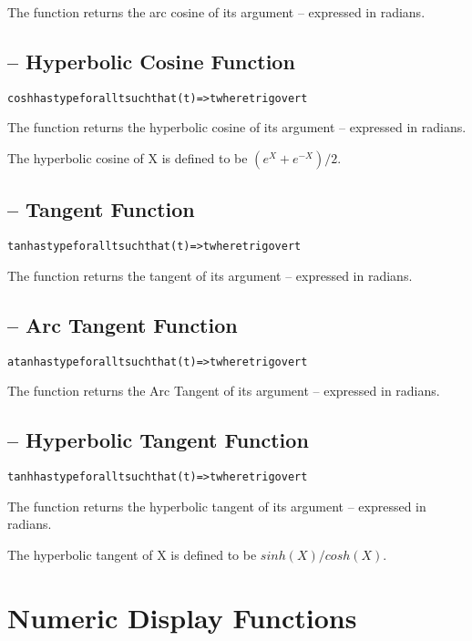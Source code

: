 The  function returns the arc cosine of its argument -- expressed in radians.

\subsection{ -- Hyperbolic Cosine Function}
\begin{alltt}
cosh has type for all t such that (t)=>t where trig over t
\end{alltt}

The  function returns the hyperbolic cosine of its argument -- expressed in radians.

The hyperbolic cosine of X is defined to be $(e^X + e^{-X})/2$.

\subsection{ -- Tangent Function}
\begin{alltt}
tan has type for all t such that (t)=>t where trig over t
\end{alltt}

The  function returns the tangent of its argument -- expressed in radians.

\subsection{ -- Arc Tangent Function}
\begin{alltt}
atan has type for all t such that (t)=>t where trig over t
\end{alltt}

The  function returns the Arc Tangent of its argument -- expressed in radians.

\subsection{ -- Hyperbolic Tangent Function}
\begin{alltt}
tanh has type for all t such that (t)=>t where trig over t
\end{alltt}

The  function returns the hyperbolic tangent of its argument -- expressed in radians.

The hyperbolic tangent of X is defined to be $sinh(X)/cosh(X)$.

\section{Numeric Display Functions}
\label{numberDisplay}

